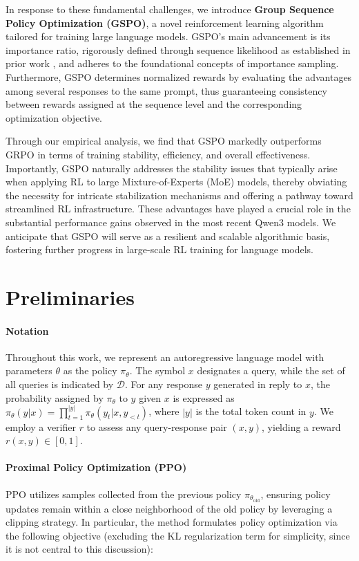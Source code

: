 In response to these fundamental challenges, we introduce \textbf{Group Sequence Policy Optimization (GSPO)}, a novel reinforcement learning algorithm tailored for training large language models. GSPO's main advancement is its importance ratio, rigorously defined through sequence likelihood as established in prior work \citep{click}, and adheres to the foundational concepts of importance sampling. Furthermore, GSPO determines normalized rewards by evaluating the advantages among several responses to the same prompt, thus guaranteeing consistency between rewards assigned at the sequence level and the corresponding optimization objective.

Through our empirical analysis, we find that GSPO markedly outperforms GRPO in terms of training stability, efficiency, and overall effectiveness. Importantly, GSPO naturally addresses the stability issues that typically arise when applying RL to large Mixture-of-Experts (MoE) models, thereby obviating the necessity for intricate stabilization mechanisms and offering a pathway toward streamlined RL infrastructure. These advantages have played a crucial role in the substantial performance gains observed in the most recent Qwen3 models. We anticipate that GSPO will serve as a resilient and scalable algorithmic basis, fostering further progress in large-scale RL training for language models.

\section{Preliminaries}

\paragraph{Notation}
Throughout this work, we represent an autoregressive language model with parameters $\theta$ as the policy $\pi_\theta$. The symbol $x$ designates a query, while the set of all queries is indicated by $\mathcal{D}$. For any response $y$ generated in reply to $x$, the probability assigned by $\pi_\theta$ to $y$ given $x$ is expressed as $\pi_\theta (y | x)=\prod_{t=1}^{|y|} \pi_\theta (y_t | x, y_{<t} )$, where $|y|$ is the total token count in $y$. We employ a verifier $r$ to assess any query-response pair $(x, y)$, yielding a reward $r(x, y) \in [ 0, 1 ]$.

\paragraph{Proximal Policy Optimization (PPO)} PPO \citep{ppo} utilizes samples collected from the previous policy $\pi_{\theta_\text{old}}$, ensuring policy updates remain within a close neighborhood of the old policy by leveraging a clipping strategy. In particular, the method formulates policy optimization via the following objective (excluding the KL regularization term for simplicity, since it is not central to this discussion):

